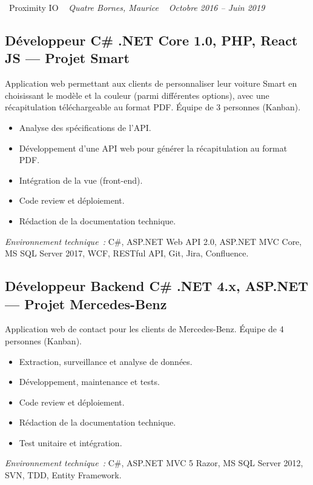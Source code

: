 \documentclass[10pt,a4paper]{article}
\begin{document}
\vspace{10pt}

\noindent\textcolor{primary}{ \faBuilding\ Proximity IO} \quad
\textit{ \small \textcolor{darkgray}{ \faMapMarker\ } Quatre Bornes, Maurice } \hfill
\textit{ \small \textcolor{darkgray}{ \faCalendar\ } Octobre 2016 -- Juin 2019 }

\vspace{4pt}

\subsection*{Développeur C\# .NET Core 1.0, PHP, React JS --- Projet Smart}
\color{darkgray}
Application web permettant aux clients de personnaliser leur voiture Smart en choisissant le modèle et la couleur (parmi différentes options), avec une récapitulation téléchargeable au format PDF. Équipe de 3 personnes (Kanban).
\begin{itemize}
  \item Analyse des spécifications de l'API.
  \item Développement d'une API web pour générer la récapitulation au format PDF.
  \item Intégration de la vue (front-end).
  \item Code review et déploiement.
  \item Rédaction de la documentation technique.
\end{itemize}
\textit{Environnement technique~:} C\#, ASP.NET Web API 2.0, ASP.NET MVC Core, MS SQL Server 2017, WCF, RESTful API, Git, Jira, Confluence.

\vspace{6pt}

\subsection*{Développeur Backend C\# .NET 4.x, ASP.NET --- Projet Mercedes-Benz}
\color{darkgray}
Application web de contact pour les clients de Mercedes-Benz. Équipe de 4 personnes (Kanban).
\begin{itemize}
  \item Extraction, surveillance et analyse de données.
  \item Développement, maintenance et tests.
  \item Code review et déploiement.
  \item Rédaction de la documentation technique.
  \item Test unitaire et intégration.
\end{itemize}
\textit{Environnement technique~:} C\#, ASP.NET MVC 5 Razor, MS SQL Server 2012, SVN, TDD, Entity Framework.
\end{document}
